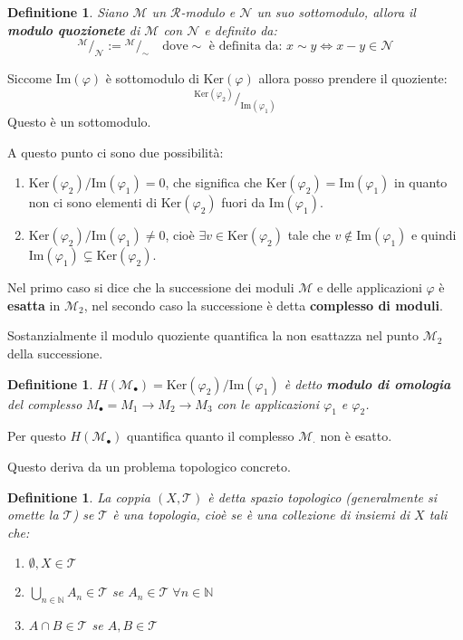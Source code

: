 \documentclass{article}
\newtheorem{definition}[theorem]{Definitione}
\newcommand{\R}{\mathcal{R}}
\newcommand{\M}{\mathcal{M}}
\newcommand{\N}{\mathcal{N}}
\newcommand{\im}{\mathrm{Im}}
\renewcommand{\ker}{\mathrm{Ker}}
\renewcommand{\phi}{\varphi}
\newcommand*\quot[2]{{^{\textstyle #1}\big/_{\textstyle #2}}}
\begin{document}
\begin{definition}
  Siano $ \M $ un $ \R $-modulo e $ \N $ un suo sottomodulo, allora il \textbf{modulo
  quozionete} di $ \M $ con $ \N $ e definito da:
  \[
    \quot{\M}{\N} := \quot{\M}{\sim} \quad \text{dove} \sim \text{ è definita da: } x \sim y \Leftrightarrow x - y \in \N
  \]
\end{definition}

Siccome $ \im (\phi) $ è sottomodulo di $ \ker (\phi) $ allora posso prendere
il quoziente:
\[
  \quot{\ker (\phi_2)}{\im (\phi_1)}
\]
Questo è un sottomodulo.

A questo punto ci sono due possibilità:
\begin{enumerate}
\item $ {\ker (\phi_2)} \slash {\im (\phi_1)} = 0 $, che significa che $ \ker (\phi_2) = \im (\phi_1) $ in quanto non ci sono elementi di $ \ker (\phi_2) $ fuori da $ \im (\phi_1) $.
\item $ {\ker (\phi_2)} \slash {\im (\phi_1)} \not= 0 $, cioè $ \exists v \in \ker (\phi_2) $
  tale che $ v \not \in \im (\phi_1) $ e quindi $ \im (\phi_1) \subsetneq \ker (\phi_2) $.
\end{enumerate}
Nel primo caso si dice che la successione dei moduli $ \M $ e delle
applicazioni $ \phi $ è \textbf{esatta} in $ \M_2$, nel secondo caso la
successione è detta \textbf{complesso di moduli}.

Sostanzialmente il modulo quoziente quantifica la non esattazza nel punto $ \M_2 $
della successione.

\begin{definition}
  $ H(\M_\bullet) = {\ker (\phi_2)} \slash {\im (\phi_1)} $ è detto \textbf{modulo di omologia}
  del complesso $ M_\bullet = M_1 \longrightarrow M_2 \longrightarrow M_3 $ con le applicazioni $ \phi_1 $ e $ \phi_2 $.
\end{definition}
Per questo  $ H(\M_\bullet) $ quantifica quanto il complesso $ \M_\cdot $ non è esatto.

Questo deriva da un problema topologico concreto.

\begin{definition}
  La coppia $ (X, \mathcal{T}) $ è detta spazio topologico (generalmente si omette la $ \mathcal{T} $)
  se $ \mathcal{T} $ è una topologia, cioè se è una collezione di insiemi di $ X $ tali che:
  \begin{enumerate}
  \item $ \emptyset, X \in \mathcal{T} $
  \item $ \bigcup_{n \in \mathbb{N}} A_n \in \mathcal{T} $ se $ A_n \in \mathcal{T} \; \forall n \in \mathbb{N} $
  \item $ A \cap B \in \mathcal{T} $ se $ A,B \in \mathcal{T} $
  \end{enumerate}
\end{definition}
\end{document}
